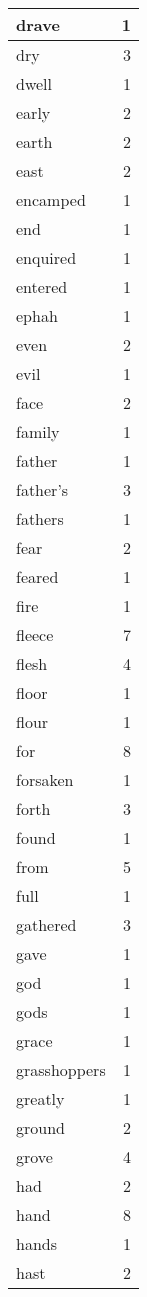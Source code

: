 \begin{center}
\begin{longtable}{l|r}
drave & 1\\ \hline 
dry & 3\\ \hline 
dwell & 1\\ \hline 
early & 2\\ \hline 
earth & 2\\ \hline 
east & 2\\ \hline 
encamped & 1\\ \hline 
end & 1\\ \hline 
enquired & 1\\ \hline 
entered & 1\\ \hline 
ephah & 1\\ \hline 
even & 2\\ \hline 
evil & 1\\ \hline 
face & 2\\ \hline 
family & 1\\ \hline 
father & 1\\ \hline 
father's & 3\\ \hline 
fathers & 1\\ \hline 
fear & 2\\ \hline 
feared & 1\\ \hline 
fire & 1\\ \hline 
fleece & 7\\ \hline 
flesh & 4\\ \hline 
floor & 1\\ \hline 
flour & 1\\ \hline 
for & 8\\ \hline 
forsaken & 1\\ \hline 
forth & 3\\ \hline 
found & 1\\ \hline 
from & 5\\ \hline 
full & 1\\ \hline 
gathered & 3\\ \hline 
gave & 1\\ \hline 
god & 1\\ \hline 
gods & 1\\ \hline 
grace & 1\\ \hline 
grasshoppers & 1\\ \hline 
greatly & 1\\ \hline 
ground & 2\\ \hline 
grove & 4\\ \hline 
had & 2\\ \hline 
hand & 8\\ \hline 
hands & 1\\ \hline 
hast & 2\\ \hline 

\end{longtable}
\end{center}
